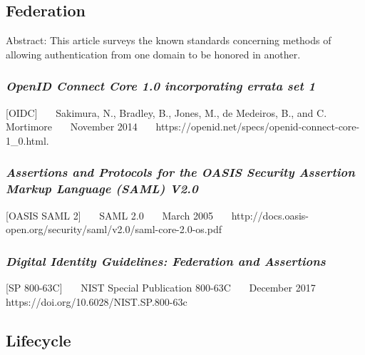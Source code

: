 \hypertarget{federation}{%
\subsection{Federation}\label{federation}}

Abstract: This article surveys the known standards concerning methods of
allowing authentication from one domain to be honored in another.

\hypertarget{openid-connect-core-1.0-incorporating-errata-set-1-1}{%
\subsubsection{\texorpdfstring{\emph{OpenID Connect Core 1.0 incorporating
errata set
1}}{OpenID Connect Core 1.0 incorporating errata set 1}}\label{openid-connect-core-1.0-incorporating-errata-set-1-1}}

{[}OIDC{]}~~~ Sakimura, N., Bradley, B., Jones, M., de Medeiros, B., and
C. Mortimore~~~ November 2014~~~
https://openid.net/specs/openid-connect-core-1\_0.html.~~~

\hypertarget{assertions-and-protocols-for-the-oasis-security-assertion-markup-language-saml-v2.0}{%
\subsubsection{\texorpdfstring{\emph{Assertions and Protocols for the OASIS
Security Assertion Markup Language (SAML)
V2.0}}{Assertions and Protocols for the OASIS Security Assertion Markup Language (SAML) V2.0}}\label{assertions-and-protocols-for-the-oasis-security-assertion-markup-language-saml-v2.0}}

{[}OASIS SAML 2{]}~~~ SAML 2.0~~~ March 2005~~~
http://docs.oasis-open.org/security/saml/v2.0/saml-core-2.0-os.pdf~~~

\hypertarget{digital-identity-guidelines-federation-and-assertions}{%
\subsubsection{\texorpdfstring{\emph{Digital Identity Guidelines: Federation
and
Assertions}}{Digital Identity Guidelines: Federation and Assertions}}\label{digital-identity-guidelines-federation-and-assertions}}

{[}SP 800-63C{]}~~~ NIST Special Publication 800-63C~~~ December 2017~~~
https://doi.org/10.6028/NIST.SP.800-63c~~~

\hypertarget{lifecycle}{%
\subsection{Lifecycle}\label{lifecycle}}


